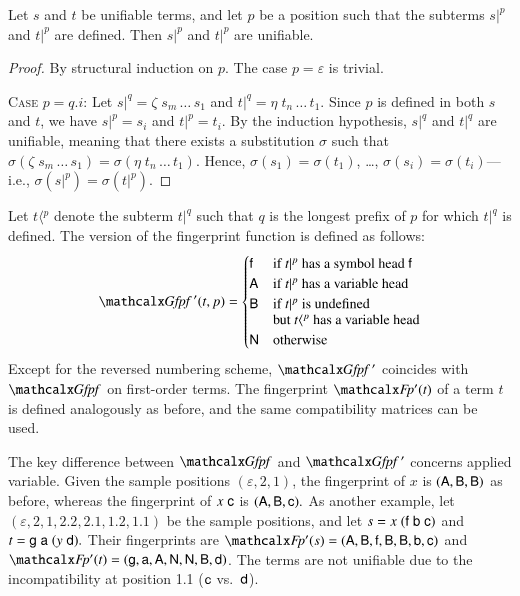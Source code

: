 \begin{lemma}\label{lemma:fpindex-aux}
  Let $s$ and $t$ be unifiable terms, and let $p$ be a position such that the
  subterms $s|^{p}$ and $t|^{p}$ are defined. Then $s|^{p}$ and $t|^{p}$ are
  unifiable.
\end{lemma}
\begin{proof}
  By structural induction on $p$. The case $p = \varepsilon$ is trivial.

  \medskip

  \noindent
  \textsc{Case $p = q.i$}:\enskip
  Let $s|^{q} = \zeta \; s_m \, \ldots \, s_1$ and $t|^{q} = \eta \; t_n \, \ldots \, t_1$.
  Since $p$ is defined in both $s$ and $t$, we have
   $s|^{p} = s_i$ and $t|^{p} = t_i$.
  By the induction hypothesis, $s|^{q}$ and $t|^{q}$ are
  unifiable, meaning that there exists a substitution $\sigma$
  such that $\sigma(\zeta \; s_m \, \ldots \, s_1) = \sigma(\eta \; t_n \, \ldots \, t_1)$.
  Hence, $\sigma(s_1) = \sigma(t_1)$, \ldots, $\sigma(s_i) = \sigma(t_i)$---i.e.,
  $\sigma(s|^{p}) = \sigma(t|^{p})$.
\end{proof}

Let $t{\langle}{}^p$ denote the subterm $t{|}^q$ such that $q$ is the longest
prefix of $p$ for which $t{|}^q$ is defined.
%
The \lfhol{} version of the fingerprint function is defined as follows:
%
\[
  \GfpfRTL(t,p) =
  \begin{cases}
    \cst{f} & \text{if $t|^p$ has a symbol head $\cst{f}$} \\
    \AA & \text{if $t|^p$ has a variable head} \\
    \BB & \text{if $t|^p$ is undefined} \\[-\jot]
        & \text{but $t{\langle}{}^p$ has a variable head} \\
    \NN & \text{otherwise}
  \end{cases}
\]
%
Except for the reversed numbering scheme,
$\GfpfRTL$ coincides with $\Gfpf$ on first-order terms.
The fingerprint $\FpRTL(t)$ of a term $t$ is defined analogously as before,
and the same compatibility matrices can be used.

The key difference between $\Gfpf$ and $\GfpfRTL$ concerns applied variable.
Given the sample positions $(\varepsilon, 2, 1)$,
the fingerprint of $x$ is $({\textsf{A}}, {\textsf{B}}, {\textsf{B}})$ as before, whereas
the fingerprint of $x \; \mathsf{c}$ is $({\textsf{A}}, {\textsf{B}}, \mathsf{c}).$
%
As another example,
let $(\varepsilon, 2,\allowbreak 1,\allowbreak 2.2,\allowbreak 2.1,\allowbreak 1.2, 1.1)$
be the sample positions,
and let $s = x \; (\mathsf{f} \; \mathsf{b} \; \mathsf{c})$ and $t = \mathsf{g}\; \mathsf{a}\; (y \; \mathsf{d}).$
Their fingerprints are
$\FpRTL(s) = (\AA, \BB, \cst{f}, \BB, \BB, \cst{b}, \cst{c})$ and
$\FpRTL(t) = (\cst{g}, \cst{a}, \AA, \NN, \NN, \BB, \cst{d})$.
%
The terms are not unifiable due to the incompatibility at position 1.1
($\mathsf{c}$ vs.~$\mathsf{d}$).

